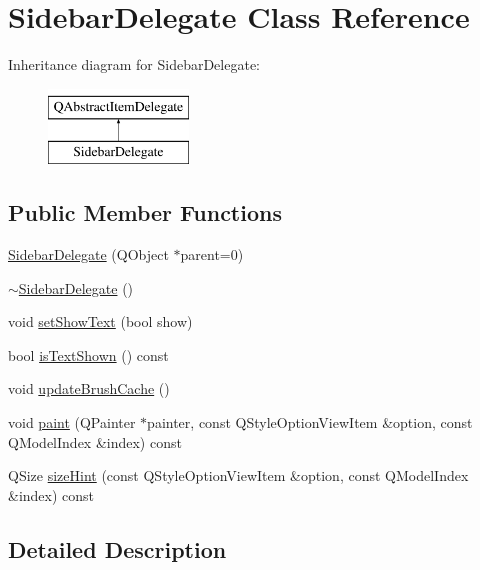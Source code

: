 \hypertarget{classSidebarDelegate}{\section{Sidebar\+Delegate Class Reference}
\label{classSidebarDelegate}
}
Inheritance diagram for Sidebar\+Delegate\+:\begin{figure}[H]
\begin{center}
\leavevmode
\includegraphics[height=2.000000cm]{classSidebarDelegate}
\end{center}
\end{figure}
\subsection*{Public Member Functions}
\begin{DoxyCompactItemize}
\item 
\hyperlink{classSidebarDelegate_adbc7b8a0ddc78e634aebebae9697c4de}{Sidebar\+Delegate} (Q\+Object $\ast$parent=0)
\item 
\hyperlink{classSidebarDelegate_a9f0a33159a9656d39de3a4c8ebaca14a}{$\sim$\+Sidebar\+Delegate} ()
\item 
void \hyperlink{classSidebarDelegate_a34dd8d82dc4a30ae4256027b1df5389e}{set\+Show\+Text} (bool show)
\item 
bool \hyperlink{classSidebarDelegate_ab6c04df28806507868097d73510b52da}{is\+Text\+Shown} () const 
\item 
void \hyperlink{classSidebarDelegate_a39a44181747b24a4fc63d606d4f3a411}{update\+Brush\+Cache} ()
\item 
void \hyperlink{classSidebarDelegate_a87bf03a4621d2d28fd3beb8c2414dd2f}{paint} (Q\+Painter $\ast$painter, const Q\+Style\+Option\+View\+Item \&option, const Q\+Model\+Index \&index) const 
\item 
Q\+Size \hyperlink{classSidebarDelegate_af7ddb692ab8af10847442673f614dd80}{size\+Hint} (const Q\+Style\+Option\+View\+Item \&option, const Q\+Model\+Index \&index) const 
\end{DoxyCompactItemize}


\subsection{Detailed Description}


